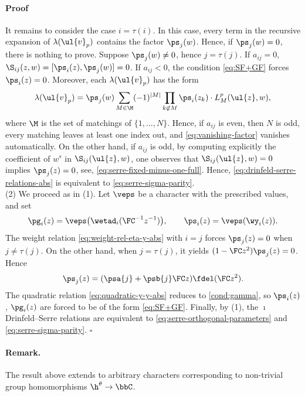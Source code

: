 \documentclass[reqno]{amsart}
\numberwithin{equation}{section}
\newenvironment{pf}{\medskip\paragraph{{\sc Proof}}}{\hfill$\square$\par\medskip}
\newenvironment{remark}{\medskip\paragraph{{\bf Remark.}}}{\par\medskip}
\begin{document}
\begin{pf}
It remains to consider the case $i=\tau(i)$. In this case, every term in the recursive expansion of $\lambda(\ul{v}_p)$ contains the factor $\ps_j(w)$. Hence, if $\ps_j(w)=0$, there is nothing to prove. Suppose $\ps_j(w)\neq0$, hence $j=\tau(j)$. If $a_{ij}=0$,
$\S_{ij}(z, w)=[\ps_i(z),\ps_j(w)]=0$. If $a_{ij}<0$, the condition \eqref{eq:SF+GF}
forces $\ps_i(z)=0$. Moreover, each $\lambda(\ul{v}_p)$ has the form
\begin{equation}\label{eq:vanishing-factor}
\lambda(\ul{v}_p)=\ps_j(w)\sum_{M\in\M}(-1)^{|M|}\prod_{k\not\in M}\ps_i(z_k)
\cdot L^p_{M}(\ul{z}, w),
\end{equation}
where $\M$ is the set of matchings of $\{1,\dots, N\}$. 
Hence, if $a_{ij}$ is even, then $N$ is odd, every matching leaves at least one index out,
and \eqref{eq:vanishing-factor} vanishes automatically.
On the other hand, if $a_{ij}$ is odd, by computing explicitly the coefficient of $w^s$ in $\S_{ij}(\ul{z},w)$, one observes that $\S_{ij}(\ul{z},w)=0$ implies $\ps_j(z)=0$, see, \eg \eqref{eq:serre-fixed-minus-one-full}. Hence, \eqref{eq:drinfeld-serre-relations-abs} is equivalent to \eqref{eq:serre-sigma-parity}.\\

(2) We proceed as in (1). Let $\veps$ be a character with the prescribed values, and set
\[
\pg_i(z)=\veps\bigl(\wetad_i(\FC^{-1}z^{-1})\bigr),
\qquad \ps_i(z)=\veps(\wy_i(z)).
\]
The weight relation \eqref{eq:weight-rel-eta-y-abs} with $i=j$ forces
$\ps_j(z)=0$ when $j\neq\tau(j)$. On the other hand, when $j=\tau(j)$, it yields
$(1-\FC z^2)\ps_j(z)=0$. Hence
\[
\ps_j(z)=(\psa{j}+\psb{j}\FC z)\fdel(\FC z^2).
\]
The quadratic relation \eqref{eq:quadratic-y-y-abs} reduces to \eqref{cond:gamma}, so
$\ps_i(z)$, $\pg_i(z)$ are forced to be of the form \eqref{eq:SF+GF}. Finally, by (1), the $\imath$Drinfeld--Serre relations are equivalent to \eqref{eq:serre-orthogonal-parameters} and \eqref{eq:serre-sigma-parity}.
\end{pf}

\begin{remark}
The result above extends to arbitrary characters corresponding to non-trivial
group homomorphisms $\h^{\theta}\to\bbC$.\hfill\rmkend
\end{remark}
\end{document}
